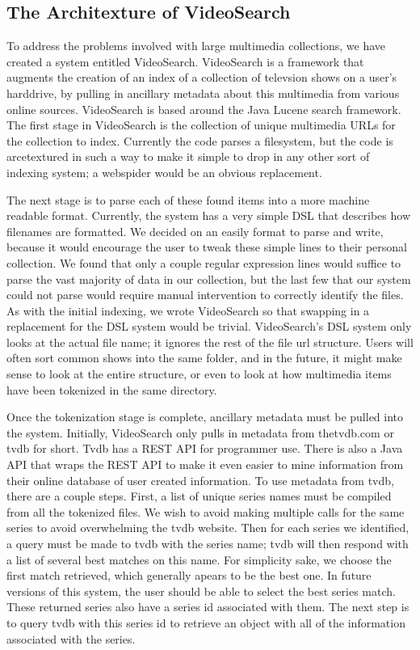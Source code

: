 \documentclass{acm_proc_article-sp}
\begin{document}
\subsection{The Architexture of VideoSearch}
    To address the problems involved with large multimedia collections, we have created a system entitled VideoSearch.  VideoSearch is a framework that augments the creation of an index of a collection of televsion shows on a user’s harddrive, by pulling in ancillary metadata about this multimedia from various online sources.  VideoSearch is based around the Java Lucene search framework.  The first stage in VideoSearch is the collection of unique multimedia URLs for the collection to index. Currently the code parses a filesystem, but the code is arcetextured in such a way to make it simple to drop in any other sort of indexing system; a webspider would be an obvious replacement.  

The next stage is to parse each of these found items into a more machine readable format.  Currently, the system has a very simple DSL that describes how filenames are formatted.  We decided on an easily format to parse and write, because it would encourage the user to tweak these simple lines to their personal collection.  \cite{favorite RE book} We found that only a couple regular expression lines would suffice to parse the vast majority of data in our collection, but the last few that our system could not parse would require manual intervention to correctly identify the files.  As with the initial indexing, we wrote VideoSearch so that swapping in a replacement for the DSL system would be trivial.  VideoSearch’s DSL system only looks at the actual file name; it ignores the rest of the file url structure.  Users will often sort common shows into the same folder, and in the future, it might make sense to look at the entire structure, or even to look at how multimedia items have been tokenized in the same directory.

Once the tokenization stage is complete, ancillary metadata must be pulled into the system.  Initially, VideoSearch only pulls in metadata from thetvdb.com or tvdb for short.  Tvdb has a REST API for programmer use. \cite{tvdb} There is also a Java API that wraps the REST API to make it even easier to mine information from their online database of user created information.  To use metadata from tvdb, there are a couple steps.  First, a list of unique series names must be compiled from all the tokenized files.  We wish to avoid making multiple calls for the same series to avoid overwhelming the tvdb website. Then for each series we identified, a query must be made to tvdb with the series name; tvdb will then respond with a list of several best matches on this name.  For simplicity sake, we choose the first match retrieved, which generally apears to be the best one. In future versions of this system, the user should be able to select the best series match.  These returned series also have a series id associated with them.  The next step is to query tvdb with this series id to retrieve an object with all of the information associated with the series.
\end{document}
